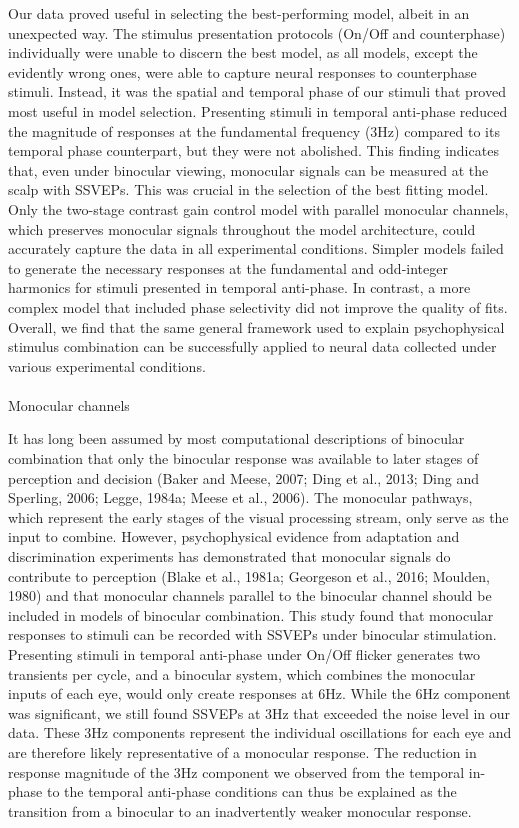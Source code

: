\documentclass[
  12pt,
]{article}
\makeatletter
\let\oldparagraph\paragraph
\renewcommand{\paragraph}{
    \@ifstar
      \xxxParagraphStar
      \xxxParagraphNoStar
  }
\newcommand{\xxxParagraphStar}[1]{\oldparagraph*{#1}\mbox{}}
\newcommand{\xxxParagraphNoStar}[1]{\oldparagraph{#1}\mbox{}}
\makeatother
\begin{document}
Our data proved useful in selecting the best-performing model, albeit in
an unexpected way. The stimulus presentation protocols (On/Off and
counterphase) individually were unable to discern the best model, as all
models, except the evidently wrong ones, were able to capture neural
responses to counterphase stimuli. Instead, it was the spatial and
temporal phase of our stimuli that proved most useful in model
selection. Presenting stimuli in temporal anti-phase reduced the
magnitude of responses at the fundamental frequency (3Hz) compared to
its temporal phase counterpart, but they were not abolished. This
finding indicates that, even under binocular viewing, monocular signals
can be measured at the scalp with SSVEPs. This was crucial in the
selection of the best fitting model. Only the two-stage contrast gain
control model with parallel monocular channels, which preserves
monocular signals throughout the model architecture, could accurately
capture the data in all experimental conditions. Simpler models failed
to generate the necessary responses at the fundamental and odd-integer
harmonics for stimuli presented in temporal anti-phase. In contrast, a
more complex model that included phase selectivity did not improve the
quality of fits. Overall, we find that the same general framework used
to explain psychophysical stimulus combination can be successfully
applied to neural data collected under various experimental conditions.

\paragraph{Monocular channels}\label{monocular-channels}

It has long been assumed by most computational descriptions of binocular
combination that only the binocular response was available to later
stages of perception and decision (Baker and Meese, 2007; Ding et al.,
2013; Ding and Sperling, 2006; Legge, 1984a; Meese et al., 2006). The
monocular pathways, which represent the early stages of the visual
processing stream, only serve as the input to combine. However,
psychophysical evidence from adaptation and discrimination experiments
has demonstrated that monocular signals do contribute to perception
(Blake et al., 1981a; Georgeson et al., 2016; Moulden, 1980) and that
monocular channels parallel to the binocular channel should be included
in models of binocular combination. This study found that monocular
responses to stimuli can be recorded with SSVEPs under binocular
stimulation. Presenting stimuli in temporal anti-phase under On/Off
flicker generates two transients per cycle, and a binocular system,
which combines the monocular inputs of each eye, would only create
responses at 6Hz. While the 6Hz component was significant, we still
found SSVEPs at 3Hz that exceeded the noise level in our data. These 3Hz
components represent the individual oscillations for each eye and are
therefore likely representative of a monocular response. The reduction
in response magnitude of the 3Hz component we observed from the temporal
in-phase to the temporal anti-phase conditions can thus be explained as
the transition from a binocular to an inadvertently weaker monocular
response.
\end{document}
